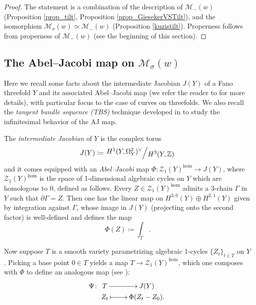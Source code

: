 \documentclass[11pt]{amsart}
\theoremstyle{definition}
\newtheorem{remark}[thm]{Remark}
\newcommand{\Z}{\mathbb{Z}}
\newcommand{\sM}{\mathcal{M}}
\newcommand{\AAA}[1]{\textcolor{red}{#1}}
\newcommand{\bigslant}[2]{\left.\raisebox{.2em}{$#1$}\middle/\raisebox{-.2em}{$#2$}\right.}
\begin{document}
\begin{proof}%
The statement is a combination of the description of $\sM_-(w)$ (Proposition \ref{prop_tilt}, Proposition \ref{prop_GiesekerVSTilt}), and the isomorphism $\sM_\sigma(w)\simeq \sM_-(w)$ (Proposition \ref{kuzistilt}). Properness follows from properness of $\sM_-(w)$ (see the beginning of this section).
\end{proof}




\subsection{The Abel--Jacobi map on $\sM_\sigma(w)$}
\label{sec_AJ_map}
Here we recall some facts about the intermediate Jacobian $J(Y)$ of a Fano threefold $Y$ and its associated Abel--Jacobi map (we refer the reader to \cite[Section~12.1]{Voi03_volumeI} for more details), with particular focus to the case of curves on threefolds. We also recall the \textit{tangent bundle sequence (TBS)} technique developed in \cite[Section~2]{Wel81} to study the infinitesimal behavior of the AJ map. 

The \emph{intermediate Jacobian} of $Y$ is the complex torus 
\[
J(Y) \coloneqq \bigslant{H^1(Y, \Omega^2_Y)^{\vee}}{H^3(Y,\Z)}
\]
and it comes equipped with an \emph{Abel--Jacobi} map $\Phi \colon\mathcal{Z}_1(Y)^{\text{hom}} \longrightarrow  J(Y)$, where $\mathcal{Z}_1(Y)^{\text{hom}}$ is the space of 1-dimensional algebraic cycles on $Y$ which are homologous to 0, defined as follows. Every $Z\in \mathcal{Z}_1(Y)^{\text{hom}}$ admits a 3-chain $\Gamma$ in $Y$ such that $\partial \Gamma=Z$. Then one has the linear map on $H^{3,0}(Y)\oplus H^{2,1}(Y)$ given by integration against $\Gamma$, whose image in $J(Y)$ (projecting onto the second factor) is well-defined and defines the map 
\[ \Phi(Z) \coloneqq  \int_\Gamma. \]

Now suppose $T$ is a smooth variety parametrizing algebraic 1-cycles $\{Z_t\}_{t \in T}$ on $Y$. Picking a base point $0\in T$ yields a map $T\to \mathcal{Z}_1(Y)^{\text{hom}}$, which one composes with $\Phi$ to define an analogous map (see \cite[Section~2]{Wel81}):
\[
\Psi \colon \xymatrix@R-2pc{T \ar[r] & J(Y) \\ Z_t \ar@{|->}[r] & \Phi(Z_t-Z_0).}
\]
\end{document}
